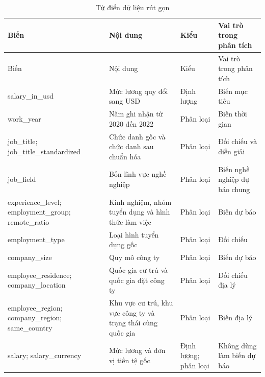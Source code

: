 \begin{longtable}[]{@{}
  >{\raggedright\arraybackslash}p{}
  >{\raggedright\arraybackslash}p{}
  >{\raggedright\arraybackslash}p{}
  >{\raggedright\arraybackslash}p{}@{}}
\caption{Từ điển dữ liệu rút gọn}\tabularnewline
\toprule\noalign{}
\begin{minipage}[b]{\linewidth}\raggedright
Biến
\end{minipage} & \begin{minipage}[b]{\linewidth}\raggedright
Nội dung
\end{minipage} & \begin{minipage}[b]{\linewidth}\raggedright
Kiểu
\end{minipage} & \begin{minipage}[b]{\linewidth}\raggedright
Vai trò trong phân tích
\end{minipage} \\
\midrule\noalign{}
\endfirsthead
\toprule\noalign{}
\begin{minipage}[b]{\linewidth}\raggedright
Biến
\end{minipage} & \begin{minipage}[b]{\linewidth}\raggedright
Nội dung
\end{minipage} & \begin{minipage}[b]{\linewidth}\raggedright
Kiểu
\end{minipage} & \begin{minipage}[b]{\linewidth}\raggedright
Vai trò trong phân tích
\end{minipage} \\
\midrule\noalign{}
\endhead
\bottomrule\noalign{}
\endlastfoot
salary\_in\_usd & Mức lương quy đổi sang USD & Định lượng & Biến mục
tiêu \\
work\_year & Năm ghi nhận từ 2020 đến 2022 & Phân loại & Biến thời
gian \\
job\_title; job\_title\_standardized & Chức danh gốc và chức danh sau
chuẩn hóa & Phân loại & Đối chiếu và diễn giải \\
job\_field & Bốn lĩnh vực nghề nghiệp & Phân loại & Biến nghề nghiệp dự
báo chung \\
experience\_level; employment\_group; remote\_ratio & Kinh nghiệm, nhóm
tuyển dụng và hình thức làm việc & Phân loại & Biến dự báo \\
employment\_type & Loại hình tuyển dụng gốc & Phân loại & Đối chiếu \\
company\_size & Quy mô công ty & Phân loại & Biến dự báo \\
employee\_residence; company\_location & Quốc gia cư trú và quốc gia đặt
công ty & Phân loại & Đối chiếu địa lý \\
employee\_region; company\_region; same\_country & Khu vực cư trú, khu
vực công ty và trạng thái cùng quốc gia & Phân loại & Biến địa lý \\
salary; salary\_currency & Mức lương và đơn vị tiền tệ gốc & Định lượng;
phân loại & Không dùng làm biến dự báo \\
\end{longtable}

